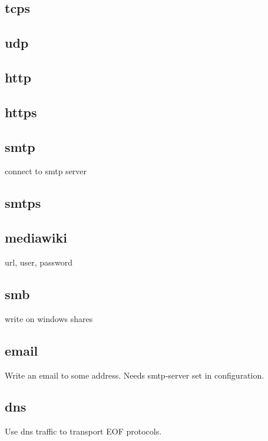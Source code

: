 \documentclass[12pt,a4paper]{book}
\begin{document}
\subsection{tcps}
\subsection{udp}
\subsection{http}
\subsection{https}
\subsection{smtp}
connect to smtp server
\subsection{smtps}
\subsection{mediawiki}
url, user, password
\subsection{smb}
write on windows shares
\subsection{email}
Write an email to some address. Needs smtp-server set in configuration.
\subsection{dns}
Use dns traffic to transport EOF protocols.
\end{document}
